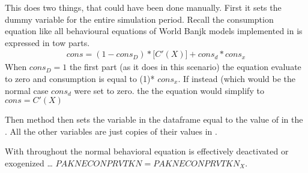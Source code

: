 \documentclass[letterpaper,10pt,english]{jupyterBook}
\begin{document}
\sphinxAtStartPar
This does two things, that could have been done manually.  First it sets the dummy variable  for the entire simulation period. Recall the consumption equation like all behavioural equations of World Banjk models implemented in is expressed in tow parts.
\begin{equation*}
\begin{split} cons= (1-cons_D)*\bigg[C'(X)\bigg] + cons_d*cons_x\end{split}
\end{equation*}
\sphinxAtStartPar
When \(cons_D=1\) the first part (as it does in this scenario) the equation evaluate to zero and consumption is equal to (1)* \(cons_x\).  If instead (which would be the normal case \(cons_d\) were set to zero. the the equation would simplify to \( cons= C'(X) \)

\sphinxAtStartPar
Then  method then sets the variable  in the  dataframe equal to the value of  in the  . All the other variables are  just copies of their values in .

\sphinxAtStartPar
With  throughout the normal behavioral equation is effectively de\sphinxhyphen{}activated or exogenized … \(PAKNECONPRVTKN=PAKNECONPRVTKN_X\).
\end{document}
